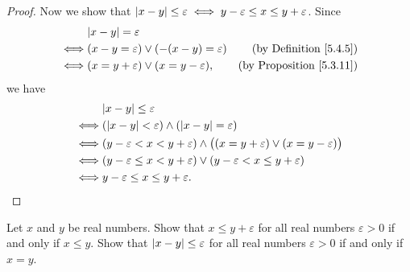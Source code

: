 \begin{proof}
    Now we show that \(\abs*{x - y} \leq \varepsilon \iff y - \varepsilon \leq x \leq y + \varepsilon\).
    Since
    \begin{align*}
             & \abs*{x - y} = \varepsilon                                                                 \\
        \iff & (x - y = \varepsilon) \lor (-(x - y) = \varepsilon) & \text{(by Definition \ref{5.4.5})}   \\
        \iff & (x = y + \varepsilon) \lor (x = y - \varepsilon),   & \text{(by Proposition \ref{5.3.11})}
    \end{align*}
    we have
    \begin{align*}
             & \abs*{x - y} \leq \varepsilon                                                                            \\
        \iff & (\abs*{x - y} < \varepsilon) \land (\abs*{x - y} = \varepsilon)                                          \\
        \iff & (y - \varepsilon < x < y + \varepsilon) \land \big((x = y + \varepsilon) \lor (x = y - \varepsilon)\big) \\
        \iff & (y - \varepsilon \leq x < y + \varepsilon) \lor (y - \varepsilon < x \leq y + \varepsilon)               \\
        \iff & y - \varepsilon \leq x \leq y + \varepsilon.
    \end{align*}
\end{proof}

\begin{exercise}\label{ex 5.4.7}
    Let \(x\) and \(y\) be real numbers.
    Show that \(x \leq y + \varepsilon\) for all real numbers \(\varepsilon > 0\) if and only if \(x \leq y\).
    Show that \(\abs*{x - y} \leq \varepsilon\) for all real numbers \(\varepsilon > 0\) if and only if \(x = y\).
\end{exercise}

